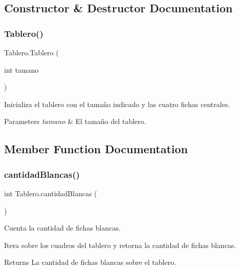 \subsection{Constructor \& Destructor Documentation}
\mbox{\label{class_tablero_ac92adc2bd5f2ed16d8ee121523956c49}} 
\subsubsection{\texorpdfstring{Tablero()}{Tablero()}}
{\footnotesize\ttfamily Tablero.\+Tablero (\begin{DoxyParamCaption}\item[{int}]{tamano }\end{DoxyParamCaption})}



Inicializa el tablero con el tamaño indicado y las cuatro fichas centrales. 


\begin{DoxyParams}{Parameters}
{\em tamano} & El tamaño del tablero. \\
\hline
\end{DoxyParams}


\subsection{Member Function Documentation}
\mbox{\label{class_tablero_a8467113a62a739be46f6a17ce876e97e}} 
\subsubsection{\texorpdfstring{cantidad\+Blancas()}{cantidadBlancas()}}
{\footnotesize\ttfamily int Tablero.\+cantidad\+Blancas (\begin{DoxyParamCaption}{ }\end{DoxyParamCaption})}



Cuenta la cantidad de fichas blancas. 

Itera sobre los cuadros del tablero y retorna la cantidad de fichas blancas.

\begin{DoxyReturn}{Returns}
La cantidad de fichas blancas sobre el tablero. 
\end{DoxyReturn}
\mbox{\label{class_tablero_af35697b272eb9fa8478867da8ce49caf}} 
